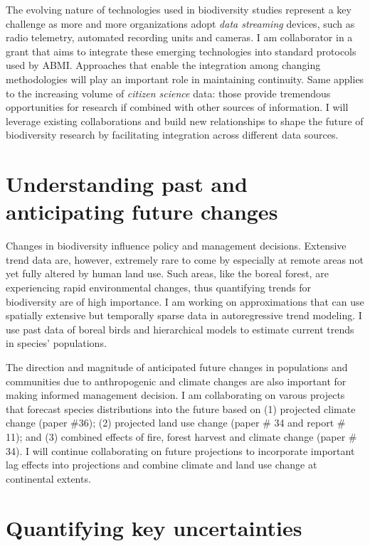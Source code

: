 The evolving nature of technologies used in biodiversity studies represent a key challenge as more and more organizations adopt \emph{data streaming} devices, such as radio telemetry, automated recording units and cameras.
I am collaborator in a grant that aims to integrate these emerging technologies into standard protocols used by ABMI. Approaches that enable the integration among changing methodologies will play an important role in maintaining continuity. Same applies to the increasing volume of \emph{citizen science} data: those provide tremendous opportunities for research if combined with other sources of information. I will leverage existing collaborations and build new relationships to shape the future of biodiversity research by facilitating integration across different data sources.

\section{ Understanding past and anticipating future changes } %

Changes in biodiversity influence policy and management decisions. 
Extensive trend data are, however, extremely rare to come by especially
at remote areas not yet fully altered by human land use. Such areas,
like the boreal forest, are experiencing rapid environmental
changes, thus quantifying trends for biodiversity are of high importance.
I am working on approximations that can use spatially extensive but
temporally sparse data in autoregressive trend modeling. I use past data of 
boreal birds and hierarchical models to estimate current trends in species'
populations.
\vspace{0.5pc}

The direction and magnitude of anticipated future changes in populations and communities
due to anthropogenic and climate changes are also important for
making informed management decision. I am collaborating on varous projects
that forecast species distributions into the future
based on (1) projected climate change (paper \#36); 
(2) projected land use change (paper \# 34 and report \# 11);
and (3) combined effects of fire, forest harvest and climate change
(paper \# 34).
I will continue collaborating on future projections to incorporate
important lag effects into projections and combine climate and land use
change at continental extents.


\section{ Quantifying key uncertainties } %

